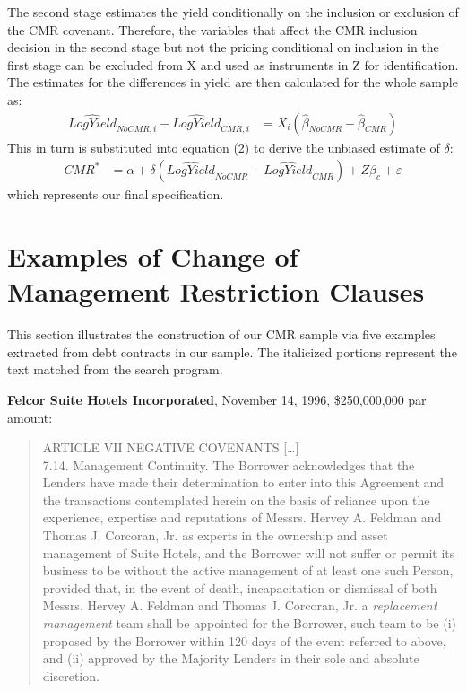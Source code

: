 \documentclass[12pt]{article}
\begin{document}
\begin{appendices}
The second stage estimates the yield conditionally on the inclusion or exclusion of the CMR covenant.
Therefore, the variables that affect the CMR inclusion decision in the second stage but not the pricing conditional on inclusion in the first stage can be excluded from X and used as instruments in Z for identification.
The estimates for the differences in yield are then calculated for the whole sample as:%
%
\begin{align}
\widehat{LogYield}_{NoCMR,i} - \widehat{LogYield}_{CMR,i} &= X_{i} \left( \hat{\beta}_{NoCMR} - \hat{\beta}_{CMR} \right)
\end{align}
This in turn is substituted into equation (2) to derive the unbiased estimate of $\delta$: %
%
\begin{align}
CMR^* &= \alpha + \delta \left(\widehat{LogYield}_{NoCMR} - \widehat{LogYield}_{CMR}\right) + Z\beta_c + \varepsilon
\end{align}%
%
which represents our final specification.














\section{Examples of Change of Management Restriction Clauses}
 \label{IApp:cmr_examples}

This section illustrates the construction of our CMR sample via five examples extracted from debt contracts in our sample.
The italicized portions represent the text matched from the search program.

\skipline


\noindent
\textbf{Felcor Suite Hotels Incorporated}, November 14, 1996, \$250,000,000 par amount:
\begin{quote}
\singlespacing \vspace{-8pt}
ARTICLE VII NEGATIVE COVENANTS [\dots]\\
7.14. Management Continuity. The Borrower acknowledges that the Lenders have made their determination to enter into this Agreement and the transactions contemplated herein on the basis of reliance upon the experience, expertise and reputations of Messrs. Hervey A. Feldman and Thomas J. Corcoran, Jr. as experts in the ownership and asset management of Suite Hotels, and the Borrower will not suffer or permit its business to be without the active management of at least one such Person, provided that, in the event of death, incapacitation or dismissal of both Messrs. Hervey A. Feldman and Thomas J. Corcoran, Jr. a \textit{replacement management} team shall be appointed for the Borrower, such team to be (i) proposed by the Borrower within 120 days of the event referred to above, and (ii) approved by the Majority Lenders in their sole and absolute discretion.
\end{quote}


\end{appendices}
\end{document}
